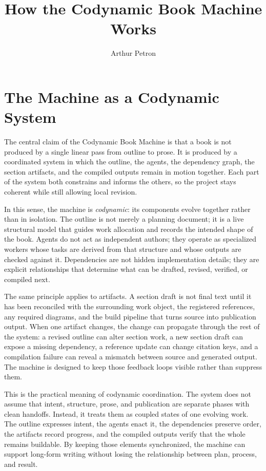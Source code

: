 \documentclass[11pt]{article}
\title{How the Codynamic Book Machine Works}
\author{Arthur Petron}
\begin{document}
\section*{The Machine as a Codynamic System}

The central claim of the Codynamic Book Machine is that a book is not produced by a single linear pass from outline to prose. It is produced by a coordinated system in which the outline, the agents, the dependency graph, the section artifacts, and the compiled outputs remain in motion together. Each part of the system both constrains and informs the others, so the project stays coherent while still allowing local revision.

In this sense, the machine is \emph{codynamic}: its components evolve together rather than in isolation. The outline is not merely a planning document; it is a live structural model that guides work allocation and records the intended shape of the book. Agents do not act as independent authors; they operate as specialized workers whose tasks are derived from that structure and whose outputs are checked against it. Dependencies are not hidden implementation details; they are explicit relationships that determine what can be drafted, revised, verified, or compiled next.

The same principle applies to artifacts. A section draft is not final text until it has been reconciled with the surrounding work object, the registered references, any required diagrams, and the build pipeline that turns source into publication output. When one artifact changes, the change can propagate through the rest of the system: a revised outline can alter section work, a new section draft can expose a missing dependency, a reference update can change citation keys, and a compilation failure can reveal a mismatch between source and generated output. The machine is designed to keep those feedback loops visible rather than suppress them.

This is the practical meaning of codynamic coordination. The system does not assume that intent, structure, prose, and publication are separate phases with clean handoffs. Instead, it treats them as coupled states of one evolving work. The outline expresses intent, the agents enact it, the dependencies preserve order, the artifacts record progress, and the compiled outputs verify that the whole remains buildable. By keeping those elements synchronized, the machine can support long-form writing without losing the relationship between plan, process, and result.
\end{document}
